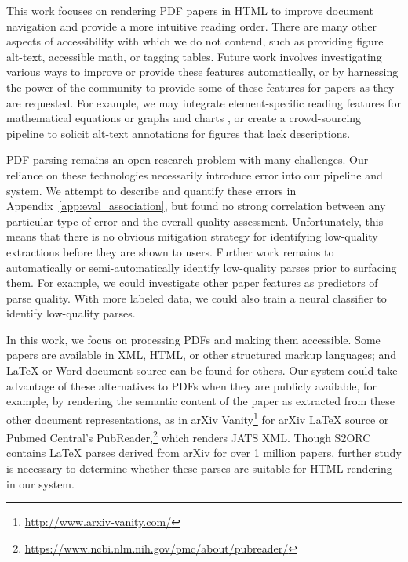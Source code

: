 This work focuses on rendering PDF papers in HTML to improve document navigation and provide a more intuitive reading order. There are many other aspects of accessibility with which we do not contend, such as providing figure alt-text, accessible math, or tagging tables. Future work involves investigating various ways to improve or provide these features automatically, or by harnessing the power of the community to provide some of these features for papers as they are requested. For example, we may integrate element-specific reading features for mathematical equations \citep{Flores2010MathMLTA, Bates2010SpokenMU, Sorge2014TowardsMM, Mackowski2017MultimediaPF} or graphs and charts \citep{Elzer2008AccessibleBC, Engel2017TowardsAC, Engel2019SVGPlottAA}, or create a crowd-sourcing pipeline to solicit alt-text annotations for figures that lack descriptions.

PDF parsing remains an open research problem with many challenges. Our reliance on these technologies necessarily introduce error into our pipeline and system. We attempt to describe and quantify these errors in Appendix~\ref{app:eval_association}, but found no strong correlation between any particular type of error and the overall quality assessment. Unfortunately, this means that there is no obvious mitigation strategy for identifying low-quality extractions before they are shown to users. Further work remains to automatically or semi-automatically identify low-quality parses prior to surfacing them. For example, we could investigate other paper features as predictors of parse quality. With more labeled data, we could also train a neural classifier to identify low-quality parses. 

In this work, we focus on processing PDFs and making them accessible. Some papers are available in XML, HTML, or other structured markup languages; and LaTeX or Word document source can be found for others. Our system could take advantage of these alternatives to PDFs when they are publicly available, for example, by rendering the semantic content of the paper as extracted from these other document representations, as in arXiv Vanity\footnote{\href{http://www.arxiv-vanity.com/}{http://www.arxiv-vanity.com/}} for arXiv LaTeX source or Pubmed Central's PubReader,\footnote{\href{https://www.ncbi.nlm.nih.gov/pmc/about/pubreader/}{https://www.ncbi.nlm.nih.gov/pmc/about/pubreader/}} which renders JATS XML. Though S2ORC \citep{lo-wang-2020-s2orc} contains LaTeX parses derived from arXiv for over 1 million papers, further study is necessary to determine whether these parses are suitable for HTML rendering in our system.

